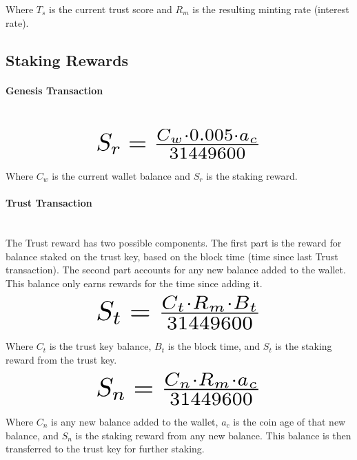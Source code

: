 \documentclass[11pt]{article}
\begin{document}
\noindent Where $T_{s}$ is the current trust score and $R_{m}$ is the resulting minting rate (interest rate).\\


\subsection{Staking Rewards}
\paragraph{Genesis Transaction} ~\\
\begin{equation}
\resizebox{.50\hsize}{!}{$S_{r} = \frac{C_{w} \cdot 0.005 \cdot a_c}{31449600}$}
\end{equation}

\noindent Where $C_{w}$ is the current wallet balance and $S_{r}$ is the staking reward.

\paragraph{Trust Transaction} ~\\
The Trust reward has two possible components. The first part is the reward for balance staked on the trust key, based on the block time (time since last Trust transaction). The second part accounts for any new balance added to the wallet. This balance only earns rewards for the time since adding it.\\

\begin{equation}
\resizebox{.50\hsize}{!}{$S_{t} = \frac{C_{t} \cdot R_{m} \cdot B_{t}}{31449600}$}
\end{equation}

\noindent Where $C_{t}$ is the trust key balance, $B_{t}$ is the block time, and $S_{t}$ is the staking reward from the trust key.\\

\begin{equation}
\resizebox{.50\hsize}{!}{$S_{n} = \frac{C_{n} \cdot R_{m} \cdot a_c}{31449600}$}
\end{equation}

\noindent Where $C_{n}$ is any new balance added to the wallet, $a_c$ is the coin age of that new balance, and $S_{n}$ is the staking reward from any new balance. This balance is then transferred to the trust key for further staking.\\
\end{document}
